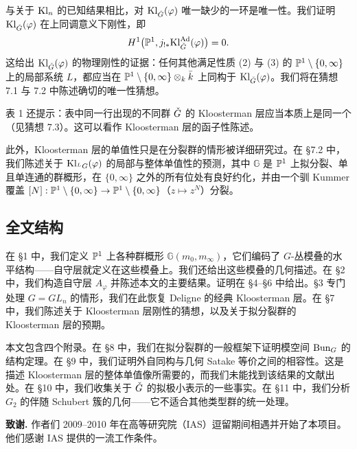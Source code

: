 与关于 $\mathrm{Kl}_n$ 的已知结果相比，对 $\mathrm{Kl}_{\check G}(\varphi)$ 唯一缺少的一环是唯一性。我们证明 $\mathrm{Kl}_{\check G}(\varphi)$ 在上同调意义下刚性，即
\[
H^1\big(\mathbb{P}^1,j_{!*}\mathrm{Kl}^{\mathrm{Ad}}_{\check G}(\varphi)\big)=0.
\]
这给出 $\mathrm{Kl}_{\check G}(\varphi)$ 的物理刚性的证据：任何其他满足性质 (2) 与 (3) 的 $\mathbb{P}^1\setminus\{0,\infty\}$ 上的局部系统 $L$，都应当在 $\mathbb{P}^1\setminus\{0,\infty\}\otimes_k\bar k$ 上同构于 $\mathrm{Kl}_{\check G}(\varphi)$。我们将在猜想 7.1 与 7.2 中陈述确切的唯一性猜想。

表 1 还提示：表中同一行出现的不同群 $\check G$ 的 Kloosterman 层应当本质上是同一个（见猜想 7.3）。这可以看作 Kloosterman 层的函子性陈述。

此外，Kloosterman 层的单值性只是在分裂群的情形被详细研究过。在 §7.2 中，我们陈述关于 $\mathrm{Kl}_{^LG}(\varphi)$ 的局部与整体单值性的预测，其中 $\mathbb{G}$ 是 $\mathbb{P}^1$ 上拟分裂、单且单连通的群概形，在 $\{0,\infty\}$ 之外的所有位处有良好约化，并由一个驯 Kummer 覆盖 $[N]:\mathbb{P}^1\setminus\{0,\infty\}\to\mathbb{P}^1\setminus\{0,\infty\}$（$z\mapsto z^N$）分裂。

\subsection{全文结构}

在 §1 中，我们定义 $\mathbb{P}^1$ 上各种群概形 $\mathbb{G}(m_0,m_\infty)$，它们编码了 $G$-丛模叠的水平结构——自守层就定义在这些模叠上。我们还给出这些模叠的几何描述。在 §2 中，我们构造自守层 $A_\varphi$ 并陈述本文的主要结果。证明在 §4–§6 中给出。§3 专门处理 $G=GL_n$ 的情形，我们在此恢复 Deligne 的经典 Kloosterman 层。在 §7 中，我们陈述关于 Kloosterman 层刚性的猜想，以及关于拟分裂群的 Kloosterman 层的预期。

本文包含四个附录。在 §8 中，我们在拟分裂群的一般框架下证明模空间 $\mathrm{Bun}_G$ 的结构定理。在 §9 中，我们证明外自同构与几何 Satake 等价之间的相容性。这是描述 Kloosterman 层的整体单值像所需要的，而我们未能找到该结果的文献出处。在 §10 中，我们收集关于 $\check G$ 的拟极小表示的一些事实。在 §11 中，我们分析 $G_2$ 的伴随 Schubert 簇的几何——它不适合其他类型群的统一处理。

\medskip
\noindent\textbf{致谢.} 作者们 2009--2010 年在高等研究院（IAS）逗留期间相遇并开始了本项目。他们感谢 IAS 提供的一流工作条件。
